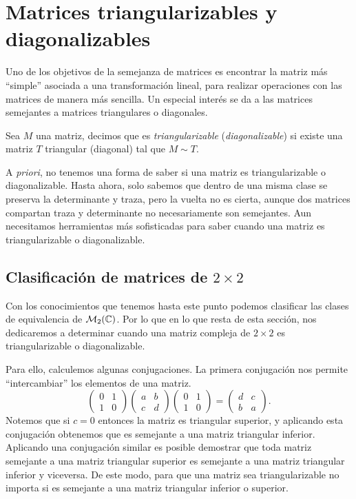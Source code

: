 \section{Matrices triangularizables y diagonalizables}

Uno de los objetivos de la semejanza de matrices es encontrar la matriz más ``simple'' asociada a una transformación lineal, para realizar operaciones con las matrices de manera más sencilla. Un especial interés se da a las matrices semejantes a matrices triangulares o diagonales.

\begin{defi}
  Sea $M$ una matriz, decimos que es \emph{triangularizable} (\emph{diagonalizable}) si existe una matriz $T$ triangular (diagonal) tal que $M \sim T$.
\end{defi}

A \emph{priori}, no tenemos una forma de saber si una matriz es triangularizable o diagonalizable. Hasta ahora, solo sabemos que dentro de una misma clase se preserva la determinante y traza, pero la vuelta no es cierta, aunque dos matrices compartan traza y determinante no necesariamente son semejantes. Aun necesitamos herramientas más sofisticadas para saber cuando una matriz es triangularizable o diagonalizable.

\subsection{Clasificación de matrices de \texorpdfstring{$2\times 2$}{2x2}}

Con los conocimientos que tenemos hasta este punto podemos clasificar las clases de equivalencia de $\mathcal{M}_2(\mathbb{C})$. Por lo que en lo que resta de esta sección, nos dedicaremos a determinar cuando una matriz compleja de $2\times 2$ es triangularizable o diagonalizable.

Para ello, calculemos algunas conjugaciones. La primera conjugación nos permite ``intercambiar'' los elementos de una matriz.
\begin{equation}
  \begin{pmatrix} 0 & 1 \\ 1 & 0 \end{pmatrix}
  \begin{pmatrix} a & b \\ c & d \end{pmatrix}
  \begin{pmatrix} 0 & 1 \\ 1 & 0 \end{pmatrix}
    = \begin{pmatrix} d & c \\ b & a \end{pmatrix}. \label{eq:ConjI}
\end{equation}
Notemos que si $c = 0$ entonces la matriz es triangular superior, y aplicando esta conjugación obtenemos que es semejante a una matriz triangular inferior. Aplicando una conjugación similar es posible demostrar que toda matriz semejante a una matriz triangular superior es semejante a una matriz triangular inferior y viceversa. De este modo, para que una matriz sea triangularizable no importa si es semejante a una matriz triangular inferior o superior.

